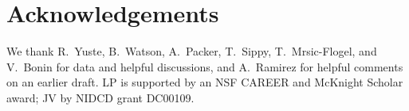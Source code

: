 \documentclass[aoas,preprint]{imsart}
\begin{document}
\section*{Acknowledgements}
We thank R.\ Yuste, B.\ Watson, A.\ Packer, T.\ Sippy, T.\
Mrsic-Flogel, and V.\ Bonin for data and helpful discussions, and A.\
Ramirez for helpful comments on an earlier draft.  LP is supported by
an NSF CAREER and McKnight Scholar award; JV by NIDCD grant DC00109.


% 

\end{document}
